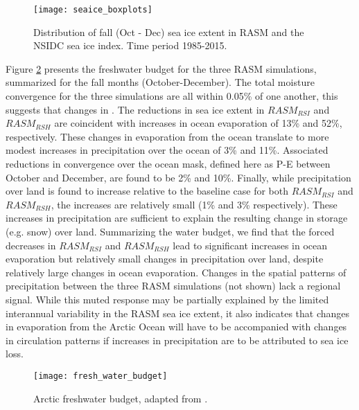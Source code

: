 \begin{figure}
  \centering
  \texttt{[image: seaice\_boxplots]}
  \caption{Distribution of fall (Oct - Dec) sea ice extent in RASM and the NSIDC sea ice index. Time period 1985-2015.}
  \label{fig:sea_ice_box}
\end{figure}

Figure \ref{fig:fwb} presents the freshwater budget for the three RASM simulations, summarized for the fall months (October-December).
The total moisture convergence for the three simulations are all within 0.05\% of one another, this suggests that changes in .
The reductions in sea ice extent in $RASM_{RSI}$ and $RASM_{RSH}$ are coincident with increases in ocean evaporation of 13\% and 52\%, respectively.
These changes in evaporation from the ocean translate to more modest increases in precipitation over the ocean of 3\% and 11\%.
Associated reductions in convergence over the ocean mask, defined here as P-E between October and December, are found to be 2\% and 10\%. %
Finally, while precipitation over land is found to increase relative to the baseline case for both $RASM_{RSI}$ and $RASM_{RSH}$, the increases are relatively small (1\% and 3\% respectively).
These increases in precipitation are sufficient to explain the resulting change in storage (e.g. snow) over land.
Summarizing the water budget, we find that the forced decreases in $RASM_{RSI}$ and $RASM_{RSH}$ lead to significant increases in ocean evaporation but relatively small changes in precipitation over land, despite relatively large changes in ocean evaporation.
Changes in the spatial patterns of precipitation between the three RASM simulations (not shown) lack a regional signal.
While this muted response may be partially explained by the limited interannual variability in the RASM sea ice extent, it also indicates that changes in evaporation from the Arctic Ocean will have to be accompanied with changes in circulation patterns if increases in precipitation are to be attributed to sea ice loss.

\begin{figure}
  \centering
  \texttt{[image: fresh\_water\_budget]}
  \caption{Arctic freshwater budget, adapted from \citet{Serreze_2006a}.}
  \label{fig:fwb}
\end{figure}

